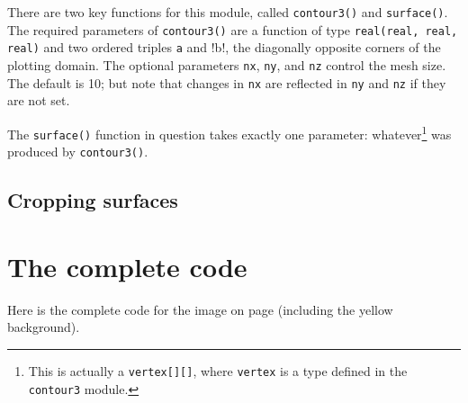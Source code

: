 \documentclass{article}
\begin{document}
There are two key functions for this module, called \lstinline!contour3()! and
\lstinline!surface()!. The required parameters of \lstinline!contour3()! are
a function of type \lstinline!real(real, real, real)! and two ordered triples
\lstinline!a! and !b!, the diagonally opposite corners of the plotting domain.
The optional parameters \lstinline!nx!, \lstinline!ny!, and \lstinline!nz!
control the mesh size. The default is 10; but note that changes in \lstinline!nx!
are reflected in \lstinline!ny! and \lstinline!nz! if they are not set.

The \lstinline!surface()! function in question takes exactly one parameter:
whatever\footnote{This is actually a \lstinline!vertex[][]!, where
\lstinline!vertex! is a type defined in the \lstinline!contour3! module.} was produced by \lstinline!contour3()!.

\subsection{Cropping surfaces}

\appendix
\section{The complete code}
Here is the complete code for 
the image on page \pageref{figure:target_diagram} (including the yellow background).


\end{document}
